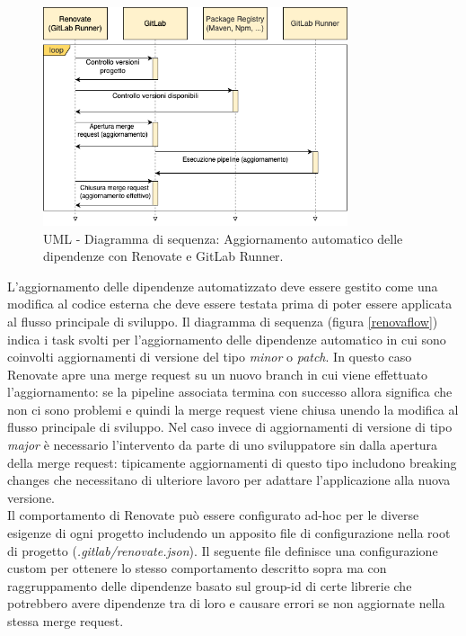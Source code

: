 \begin{figure}[H]
\centering
\includegraphics[width=0.8\textwidth]{img/tesi-2-Page-17.drawio.png}
\caption{UML - Diagramma di sequenza: Aggiornamento automatico delle dipendenze con Renovate e GitLab Runner.}
\end{figure}

L'aggiornamento delle dipendenze automatizzato deve essere gestito come una modifica al codice esterna che deve essere testata prima di poter essere applicata al flusso principale di sviluppo. Il diagramma di sequenza (figura \ref{renovaflow}) indica i task svolti per l'aggiornamento delle dipendenze automatico in cui sono coinvolti aggiornamenti di versione del tipo \textit{minor} o \textit{patch}. In questo caso Renovate apre una merge request su un nuovo branch in cui viene effettuato l'aggiornamento: se la pipeline associata termina con successo allora significa che non ci sono problemi e quindi la merge request viene chiusa unendo la modifica al flusso principale di sviluppo. Nel caso invece di aggiornamenti di versione di tipo \textit{major} è necessario l'intervento da parte di uno sviluppatore sin dalla apertura della merge request: tipicamente aggiornamenti di questo tipo includono breaking changes che necessitano di ulteriore lavoro per adattare l'applicazione alla nuova versione.\\
Il comportamento di Renovate può essere configurato ad-hoc per le diverse esigenze di ogni progetto includendo un apposito file di configurazione nella root di progetto (\textit{.gitlab/renovate.json}). Il seguente file definisce una configurazione custom per ottenere lo stesso comportamento descritto sopra ma con raggruppamento delle dipendenze basato sul group-id di certe librerie che potrebbero avere dipendenze tra di loro e causare errori se non aggiornate nella stessa merge request.

